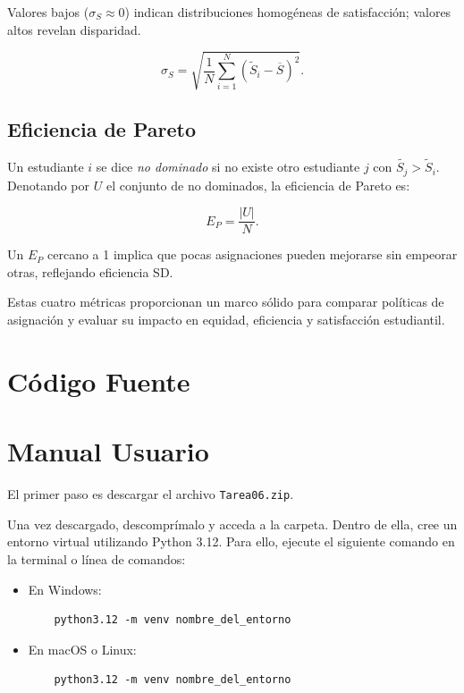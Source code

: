 \documentclass{article}
\begin{document}
Valores bajos ($\sigma_S \approx0$) indican distribuciones homogéneas de satisfacción; valores altos revelan disparidad.

$$
\sigma_S = \sqrt{ \frac{1}{N} \sum_{i=1}^N (\widetilde S_i - \overline S)^2 }.
$$

\subsection{Eficiencia de Pareto}
Un estudiante $i$ se dice \emph{no dominado} si no existe otro estudiante 
$j$ con $\widetilde{S_j} > \widetilde S_i$. Denotando por $U$ el
 conjunto de no dominados, la eficiencia de Pareto es:

$$
E_P = \frac{|U|}{N}.
$$

Un $E_P$ cercano a 1 implica que pocas asignaciones pueden mejorarse sin empeorar otras, reflejando eficiencia SD.

Estas cuatro métricas proporcionan un marco sólido para comparar políticas de asignación y evaluar su impacto en equidad, eficiencia y satisfacción estudiantil.



\section{Código Fuente}\label{sec:cod}



\section{Manual Usuario}\label{sec:man_u}

El primer paso es descargar el archivo \texttt{Tarea06.zip}.

Una vez descargado, descomprímalo y acceda a la carpeta. Dentro de ella, cree un 
entorno virtual utilizando Python 3.12. Para ello, ejecute el siguiente comando en 
la terminal o línea de comandos:

\begin{itemize}
  \item En Windows:
  \begin{verbatim}
    python3.12 -m venv nombre_del_entorno
  \end{verbatim}
  \item En macOS o Linux:
  \begin{verbatim}
    python3.12 -m venv nombre_del_entorno
  \end{verbatim}
\end{itemize}
\end{document}
